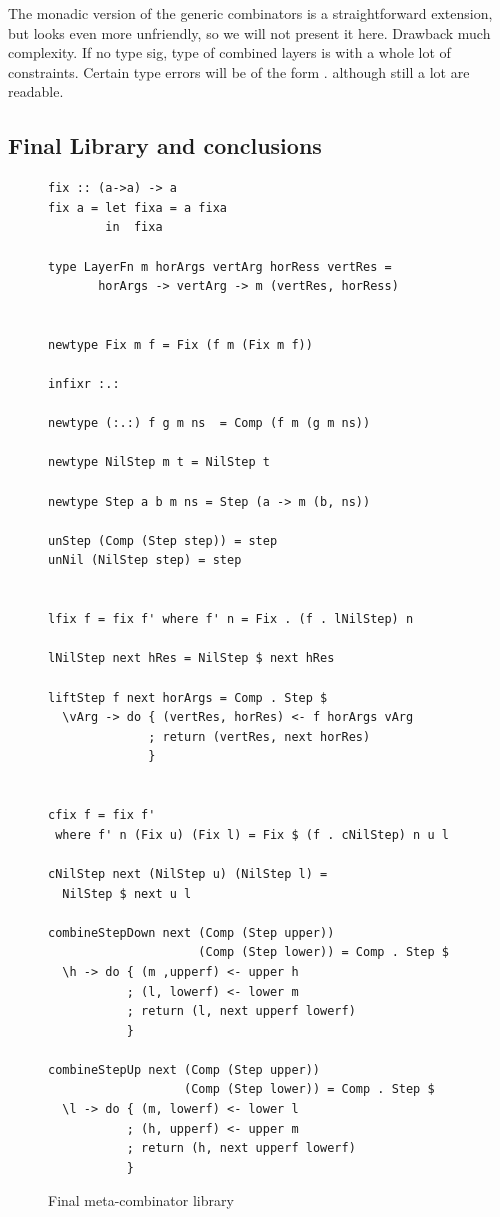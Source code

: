 \documentclass[preprint,natbib]{sigplanconf}
\begin{document}
The monadic version of the generic combinators is a straightforward extension, but looks even more unfriendly, so we will not present it here. 
Drawback much complexity. If no type sig, type of combined layers is  with a whole lot of constraints. Certain type errors will be of the form . although still a lot are readable.


%																
\subsection{Final Library and conclusions} \label{sect:libAndConclusions}

\begin{figure}
\begin{small}
\begin{center}
\begin{footnotesize}
\begin{verbatim}
fix :: (a->a) -> a
fix a = let fixa = a fixa
        in  fixa

type LayerFn m horArgs vertArg horRess vertRes =
       horArgs -> vertArg -> m (vertRes, horRess)


newtype Fix m f = Fix (f m (Fix m f))

infixr :.:

newtype (:.:) f g m ns  = Comp (f m (g m ns))

newtype NilStep m t = NilStep t

newtype Step a b m ns = Step (a -> m (b, ns))

unStep (Comp (Step step)) = step
unNil (NilStep step) = step


lfix f = fix f' where f' n = Fix . (f . lNilStep) n

lNilStep next hRes = NilStep $ next hRes

liftStep f next horArgs = Comp . Step $ 
  \vArg -> do { (vertRes, horRes) <- f horArgs vArg
              ; return (vertRes, next horRes)
              }
              

cfix f = fix f' 
 where f' n (Fix u) (Fix l) = Fix $ (f . cNilStep) n u l

cNilStep next (NilStep u) (NilStep l) = 
  NilStep $ next u l

combineStepDown next (Comp (Step upper)) 
                     (Comp (Step lower)) = Comp . Step $
  \h -> do { (m ,upperf) <- upper h
           ; (l, lowerf) <- lower m
           ; return (l, next upperf lowerf)   
           }

combineStepUp next (Comp (Step upper)) 
                   (Comp (Step lower)) = Comp . Step $
  \l -> do { (m, lowerf) <- lower l
           ; (h, upperf) <- upper m
           ; return (h, next upperf lowerf)
           }
\end{verbatim} %
\end{footnotesize}\caption{Final meta-combinator library}\label{fig:metacombinators} 
\end{center}
\end{small}
\end{figure}
\end{document}

